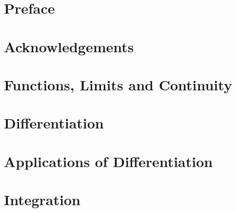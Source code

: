 \documentclass[12pt,a4paper,oneside]{report}
\begin{document}
\chapter*{Preface}


\chapter*{Acknowledgements}


\tableofcontents

\mainmatter
\chapter{Functions, Limits and Continuity}
\makenewpage
\makenewpage
\makenewpage
\makenewpage
\makenewpage
\makenewpage
\makenewpage

\chapter{Differentiation}
\makenewpage
\makenewpage
\makenewpage
\makenewpage
\makenewpage
\makenewpage

\chapter{Applications of Differentiation}
\makenewpage
\makenewpage
\makenewpage  
\makenewpage
\makenewpage

\chapter{Integration}
\makenewpage
\makenewpage
\makenewpage
\makenewpage
\makenewpage
\makenewpage
\end{document}
